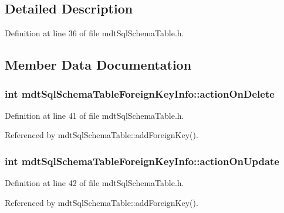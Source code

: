 \subsection{Detailed Description}


Definition at line 36 of file mdt\-Sql\-Schema\-Table.\-h.



\subsection{Member Data Documentation}
\hypertarget{structmdt_sql_schema_table_foreign_key_info_a0c653ac4f2e5fdfe9dce56bfb4f09ee5}{
\subsubsection[{action\-On\-Delete}]{\setlength{\rightskip}{0pt plus 5cm}int mdt\-Sql\-Schema\-Table\-Foreign\-Key\-Info\-::action\-On\-Delete}}\label{structmdt_sql_schema_table_foreign_key_info_a0c653ac4f2e5fdfe9dce56bfb4f09ee5}


Definition at line 41 of file mdt\-Sql\-Schema\-Table.\-h.



Referenced by mdt\-Sql\-Schema\-Table\-::add\-Foreign\-Key().

\hypertarget{structmdt_sql_schema_table_foreign_key_info_ae43338084ff992252607f38078053475}{
\subsubsection[{action\-On\-Update}]{\setlength{\rightskip}{0pt plus 5cm}int mdt\-Sql\-Schema\-Table\-Foreign\-Key\-Info\-::action\-On\-Update}}\label{structmdt_sql_schema_table_foreign_key_info_ae43338084ff992252607f38078053475}


Definition at line 42 of file mdt\-Sql\-Schema\-Table.\-h.



Referenced by mdt\-Sql\-Schema\-Table\-::add\-Foreign\-Key().

